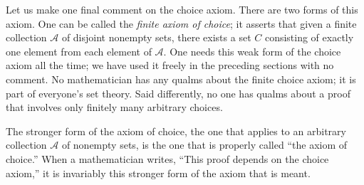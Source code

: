 Let us make one final comment on the choice axiom. There are two forms of this axiom. 
One can be called the \textit{finite axiom of choice}; it asserts that given a finite collection \(\mathcal{A}\) of disjoint 
nonempty sets, there exists a set \(C\) consisting of exactly one element from each element of 
\(\mathcal{A}\). One needs this weak form of the choice axiom all the time; we have used it freely 
in the preceding sections with no comment. No mathematician has any qualms about the finite choice axiom; 
it is part of everyone's set theory. Said differently, no one has qualms about a proof that involves 
only finitely many arbitrary choices.

The stronger form of the axiom of choice, the one that applies to an arbitrary collection 
\(\mathcal{A}\) of nonempty sets, is the one that is properly called ``the axiom of choice.'' 
When a mathematician writes, ``This proof depends on the choice axiom,'' it is invariably this 
stronger form of the axiom that is meant.

